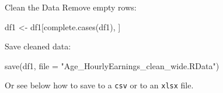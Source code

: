 \documentclass[
  11pt,
  ignorenonframetext,
  svgnames, handout, t]{beamer}
\newenvironment{Shaded}{\begin{snugshade}}{\end{snugshade}}
\newcommand{\AttributeTok}[1]{\textcolor[rgb]{0.77,0.63,0.00}{#1}}
\newcommand{\FunctionTok}[1]{\textcolor[rgb]{0.00,0.00,0.00}{#1}}
\newcommand{\NormalTok}[1]{#1}
\newcommand{\OtherTok}[1]{\textcolor[rgb]{0.56,0.35,0.01}{#1}}
\newcommand{\StringTok}[1]{\textcolor[rgb]{0.31,0.60,0.02}{#1}}
\begin{document}
\begin{frame}[fragile]{Clean the Data}
\protect\hypertarget{clean-the-data-1}{}
Remove empty rows:

\footnotesize

\begin{Shaded}
\begin{Highlighting}[]
\NormalTok{df1 }\OtherTok{\textless{}{-}}\NormalTok{ df1[}\FunctionTok{complete.cases}\NormalTok{(df1), ] }
\end{Highlighting}
\end{Shaded}

\normalsize

Save cleaned data:

\footnotesize

\begin{Shaded}
\begin{Highlighting}[]
\FunctionTok{save}\NormalTok{(df1, }\AttributeTok{file =} \StringTok{"Age\_HourlyEarnings\_clean\_wide.RData"}\NormalTok{)}
\end{Highlighting}
\end{Shaded}

\normalsize

Or see below how to save to a \texttt{csv} or to an \texttt{xlsx} file.
\end{frame}
\end{document}
